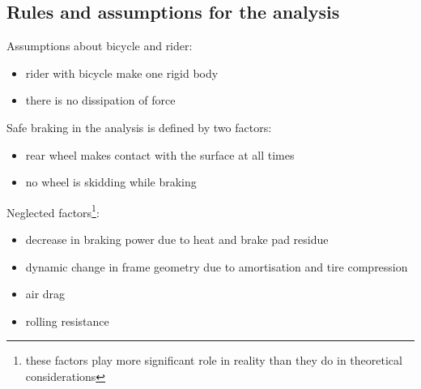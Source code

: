 \documentclass[12pt]{article}
\begin{document}
\subsection{Rules and assumptions for the analysis}
Assumptions about bicycle and rider:
\begin{itemize}
\item{rider with bicycle make one rigid body}
\item{there is no dissipation of force}
\end{itemize}
Safe braking in the analysis is defined by two factors:
\begin{itemize}
\item{rear wheel makes contact with the surface at all times}
\item{no wheel is skidding while braking}
\end{itemize}
Neglected factors\footnote[1]{these factors play more significant role in reality than they do in theoretical
considerations}:
\begin{itemize}
\item{decrease in braking power due to heat and brake pad residue}
\item{dynamic change in frame geometry due to amortisation and tire compression}
\item{air drag}
\item{rolling resistance}
\end{itemize}
\newpage
\end{document}
